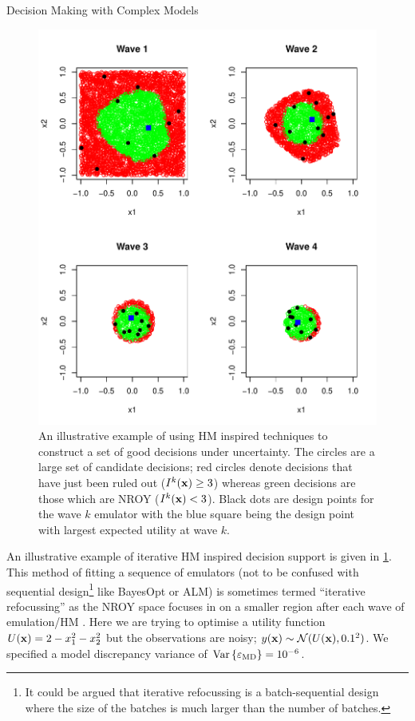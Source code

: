 \begin{chapter}{Decision Making with Complex Models \label{Chap:optimisation}}
\begin{figure}
 \includegraphics{fig-optim/quad-optim.pdf}
 \caption{An illustrative example of using HM inspired techniques to construct a set of good decisions under uncertainty. The circles are a large set of candidate decisions; red circles denote decisions that have just been ruled out ($I^k(\mathbf{x}) \geq 3$) whereas green decisions are those which are NROY ($I^k(\mathbf{x}) < 3$). Black dots are design points for the wave $k$ emulator with the blue square being the design point with largest expected utility at wave $k$. \label{fig:quad-optim}}
\end{figure}
An illustrative example of iterative HM inspired decision support is given in \cref{fig:quad-optim}. This method of fitting a sequence of emulators (not to be confused with sequential design\footnote{It could be argued that iterative refocussing is a batch-sequential design where the size of the batches is much larger than the number of batches.} like BayesOpt or ALM) is sometimes termed ``iterative refocussing'' as the NROY space focuses in on a smaller region after each wave of emulation/HM \citep{Williamson2017, Volodina2021}. Here we are trying to optimise a utility function $U(\mathbf{x}) = 2 - x_1^2 - x^2_2$ but the observations are noisy; $y(\mathbf{x}) \sim \mathcal{N}(U(\mathbf{x}), 0.1^2)$. We specified a model discrepancy variance of $\mathrm{Var}\,\{\varepsilon_{\text{MD}}\} = 10^{-6}$.


\end{chapter}
